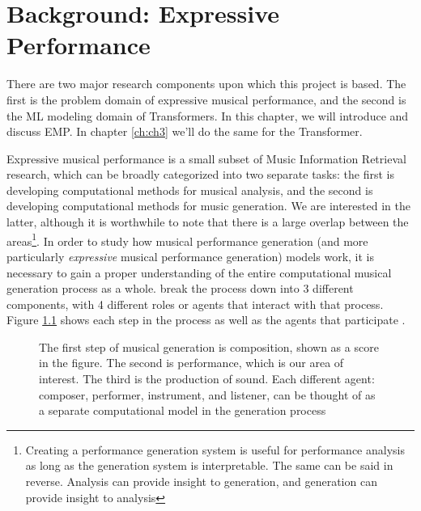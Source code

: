 \chapter{Background: Expressive Performance}\label{ch:ch2}

There are two major research components upon which this project is based. The first is the problem domain of expressive musical performance, and the second is the ML modeling domain of Transformers. In this chapter, we will introduce and discuss EMP. In chapter \ref{ch:ch3} we'll do the same for the Transformer. 

Expressive musical performance is a small subset of Music Information Retrieval research, which can be broadly categorized into two separate tasks: the first is developing computational methods for musical analysis, and the second is developing computational methods for music generation. We are interested in the latter, although it is worthwhile to note that there is a large overlap between the areas\footnote{Creating a performance generation system is useful for performance analysis as long as the generation system is interpretable. The same can be said in reverse. Analysis can provide insight to generation, and generation can provide insight to analysis}. In order to study how musical performance generation (and more particularly \emph{expressive} musical performance generation) models work, it is necessary to gain a proper understanding of the entire computational musical generation process as a whole. \citet{ji2020comprehensive} break the process down into 3 different components, with 4 different roles or agents that interact with that process. Figure \ref{fig:generation_process} shows each step in the process as well as the agents that participate .

\begin{figure}
    \centering
    \caption{The first step of musical generation is composition, shown as a score in the figure. The second is performance, which is our area of interest. The third is the production of sound. Each different agent: composer, performer, instrument, and listener, can be thought of as a separate computational model in the generation process}
    \label{fig:generation_process}
\end{figure}

